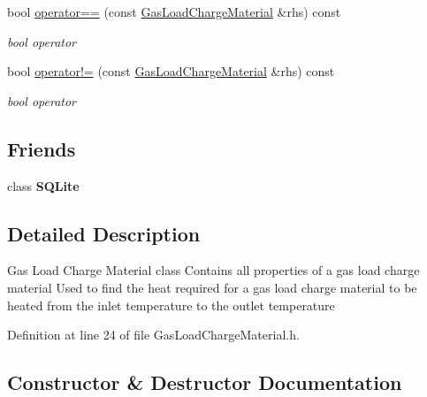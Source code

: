 \begin{DoxyCompactItemize}
\item 
\mbox{\label{class_gas_load_charge_material_ac1d95bdf7d61d8ed98629aa17bf2c4b1}} 
bool \hyperlink{class_gas_load_charge_material_ac1d95bdf7d61d8ed98629aa17bf2c4b1}{operator==} (const \hyperlink{class_gas_load_charge_material}{Gas\+Load\+Charge\+Material} \&rhs) const
\begin{DoxyCompactList}\small\item\em bool operator \end{DoxyCompactList}\item 
\mbox{\label{class_gas_load_charge_material_ac6bc3f665a91fde01ebf6d1528cb7332}} 
bool \hyperlink{class_gas_load_charge_material_ac6bc3f665a91fde01ebf6d1528cb7332}{operator!=} (const \hyperlink{class_gas_load_charge_material}{Gas\+Load\+Charge\+Material} \&rhs) const
\begin{DoxyCompactList}\small\item\em bool operator \end{DoxyCompactList}\end{DoxyCompactItemize}
\subsection*{Friends}
\begin{DoxyCompactItemize}
\item 
\mbox{\label{class_gas_load_charge_material_a0102f3b3c0cbf96db6c49f071fa5e7cc}} 
class {\bfseries S\+Q\+Lite}
\end{DoxyCompactItemize}


\subsection{Detailed Description}
Gas Load Charge Material class Contains all properties of a gas load charge material Used to find the heat required for a gas load charge material to be heated from the inlet temperature to the outlet temperature 

Definition at line 24 of file Gas\+Load\+Charge\+Material.\+h.



\subsection{Constructor \& Destructor Documentation}
\mbox{\label{class_gas_load_charge_material_aec7d944af0d8b649d8f971240f52d995}} 
